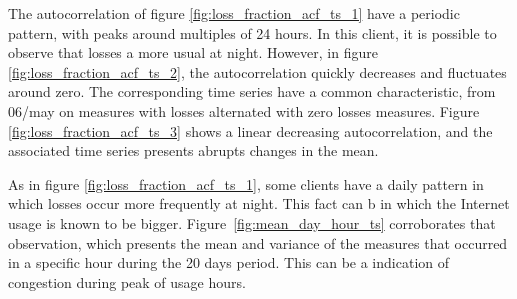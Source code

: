 The autocorrelation of figure \ref{fig:loss_fraction_acf_ts_1} have a periodic pattern, with peaks around multiples of 24 hours. In this client, it is possible to observe that losses a more usual at night. However, in figure \ref{fig:loss_fraction_acf_ts_2}, the autocorrelation quickly decreases and fluctuates around zero. The corresponding time series have a common characteristic, from 06/may on measures with losses alternated with zero losses measures. Figure \ref{fig:loss_fraction_acf_ts_3} shows a linear decreasing autocorrelation, and the associated time series presents abrupts changes in the mean. 

As in figure \ref{fig:loss_fraction_acf_ts_1}, some clients have a daily pattern in which losses occur more frequently at night. This fact can b in which the Internet usage is known to be bigger. Figure~\ref{fig:mean_day_hour_ts} corroborates that observation, which presents the mean and variance of the measures that occurred in a specific hour during the 20 days period. This can be a indication of congestion during peak of usage hours.

